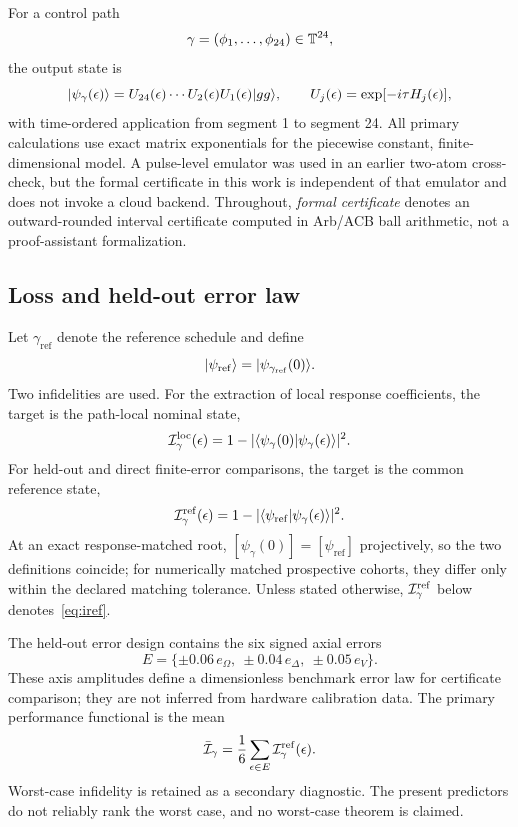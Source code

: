 For a control path
\[
\gamma=(\phi_{1},\ldots,\phi_{24})\in\mathbb{T}^{24},
\]
the output state is
\begin{equation}\label{eq:output}
\lvert \psi_{\gamma}(\epsilon) \rangle=U_{24}(\epsilon)\cdots U_{2}(\epsilon)U_{1}(\epsilon)\lvert gg \rangle,
\qquad U_{j}(\epsilon)=\exp[-i\tau H_{j}(\epsilon)],
\end{equation}
with time-ordered application from segment 1 to segment 24. All primary calculations use
exact matrix exponentials for the piecewise constant, finite-dimensional model. A
pulse-level emulator was used in an earlier two-atom cross-check, but the formal
certificate in this work is independent of that emulator and does not invoke a cloud
backend. Throughout, \emph{formal certificate} denotes an outward-rounded interval
certificate computed in Arb/ACB ball arithmetic, not a proof-assistant formalization.

\subsection{Loss and held-out error law}

Let $\gamma_{\mathrm{ref}}$ denote the reference schedule and define
\[
\lvert \psi_{\mathrm{ref}} \rangle=\lvert \psi_{\gamma_{\mathrm{ref}}}(0) \rangle.
\]
Two infidelities are used. For the extraction of local response coefficients, the target is
the path-local nominal state,
\begin{equation}\label{eq:iloc}
\mathcal{I}^{\mathrm{loc}}_{\gamma}(\epsilon)=1-\lvert\langle \psi_{\gamma}(0) \vert \psi_{\gamma}(\epsilon) \rangle\rvert^{2}.
\end{equation}
For held-out and direct finite-error comparisons, the target is the common reference state,
\begin{equation}\label{eq:iref}
\mathcal{I}^{\mathrm{ref}}_{\gamma}(\epsilon)=1-\lvert\langle \psi_{\mathrm{ref}} \vert \psi_{\gamma}(\epsilon) \rangle\rvert^{2}.
\end{equation}
At an exact response-matched root, $[\psi_{\gamma}(0)]=[\psi_{\mathrm{ref}}]$ projectively,
so the two definitions coincide; for numerically matched prospective cohorts, they differ
only within the declared matching tolerance. Unless stated otherwise, $\mathcal{I}^{\mathrm{ref}}_{\gamma}$ below
denotes~\eqref{eq:iref}.

The held-out error design contains the six signed axial errors
\begin{equation}\label{eq:errorlaw}
E=\{\pm 0.06\,e_{\Omega},\ \pm 0.04\,e_{\Delta},\ \pm 0.05\,e_{V}\}.
\end{equation}
These axis amplitudes define a dimensionless benchmark error law for certificate comparison;
they are not inferred from hardware calibration data. The primary performance functional is
the mean
\begin{equation}\label{eq:meanloss}
\bar{\mathcal{I}}_{\gamma}=\frac{1}{6}\sum_{\epsilon\in E}\mathcal{I}^{\mathrm{ref}}_{\gamma}(\epsilon).
\end{equation}
Worst-case infidelity is retained as a secondary diagnostic. The present predictors do not
reliably rank the worst case, and no worst-case theorem is claimed.

